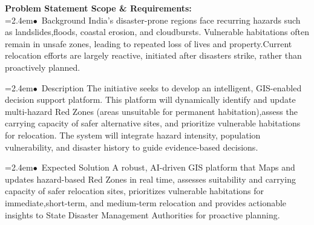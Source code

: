 \documentclass[10pt,a4paper]{article}
\begin{document}
\begin{tcolorbox}[pscard, title={"\textbf{SIH26191} \quad $\vert$ \quad Intelligent Identification of Hazard-Based Red Zones, Carrying Capacity Ass...}]
\textbf{\color{sihnavy}Problem Statement Scope \& Requirements:}\\[0.15cm]
\noindent\hspace*{1.2em}\hangindent=2.4em\textcolor{sihblue}{$\bullet$}~\small Background India's disaster-prone regions face recurring hazards such as landslides,floods, coastal erosion, and cloudbursts. Vulnerable habitations often remain in unsafe zones, leading to repeated loss of lives and property.Current relocation efforts are largely reactive, initiated after disasters strike, rather than proactively planned.\par\vspace{0.05cm}
\noindent\hspace*{1.2em}\hangindent=2.4em\textcolor{sihblue}{$\bullet$}~\small Description The initiative seeks to develop an intelligent, GIS-enabled decision support platform. This platform will dynamically identify and update multi-hazard Red Zones (areas unsuitable for permanent habitation),assess the carrying capacity of safer alternative sites, and prioritize vulnerable habitations for relocation. The system will integrate hazard intensity, population vulnerability, and disaster history to guide evidence-based decisions.\par\vspace{0.05cm}
\noindent\hspace*{1.2em}\hangindent=2.4em\textcolor{sihblue}{$\bullet$}~\small Expected Solution A robust, AI-driven GIS platform that Maps and updates hazard-based Red Zones in real time, assesses suitability and carrying capacity of safer relocation sites, prioritizes vulnerable habitations for immediate,short-term, and medium-term relocation and provides actionable insights to State Disaster Management Authorities for proactive planning.\par\vspace{0.05cm}

\end{tcolorbox}
\vspace{0.4cm}
{}
\end{document}
